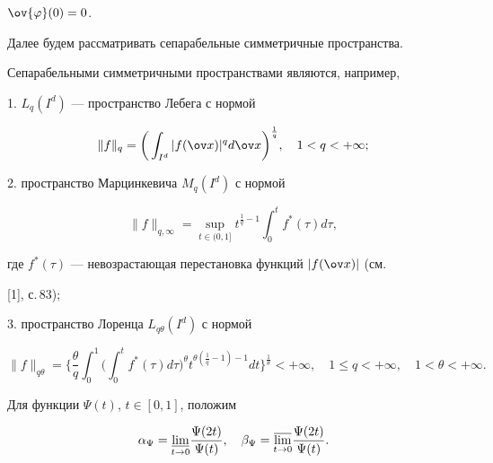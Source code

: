 $\ov{\varphi}(0)=0$. 





Далее будем рассматривать сепарабельные симметричные пространства.


Сепарабельными симметричными пространствами являются, например,





1. $L_{q}(I^{d})$ --- пространство Лебега с нормой 


$$


\|f\|_{q}=\bigg(\int_{I^{d}}|f(\ov x)|^{q}d\ov 


x\bigg)^{\frac{1}{q}},\quad 1<q<+\infty;


$$





2. пространство Марцинкевича $M_{q}(I^{d})$ с нормой 


$$


\|f\|_{q,\infty}=\sup_{t\in(0,1]}t^{\frac{1}{q}-1}\int_{0}^{t}f^{*}


(\tau)d\tau,


$$


где $f^{*}(\tau)$ --- невозрастающая перестановка функций $|f(\ov x)|$ (см. 


[1], с.\,83);





3. пространство Лоренца $L_{q\theta}(I^{d})$ с нормой 


$$


\|f\|_{q\theta}=\bigg\{\frac{\theta}{q}\int_{0}^{1}\bigg(\int_{0}^{t}f^{*}


(\tau)d\tau\bigg)^{\theta}t^{\theta(\frac{1}{q}-1)-1}dt


\bigg\}^{\frac{1}{\theta}}<+\infty, \quad 1\leq q<+\infty, \quad 


1<\theta<+\infty.


$$





Для функции $\Psi(t)$, $t\in [0,1]$, положим


$$


\alpha_{\Psi}=\underset{t\rightarrow 0}{\varliminf}{}


\frac{\Psi(2t)}{\Psi(t)},\quad 


\beta_{\Psi}=\underset{t\rightarrow 0}{\varlimsup}{}\frac{\Psi(2t)}{\Psi(t)}.


$$


